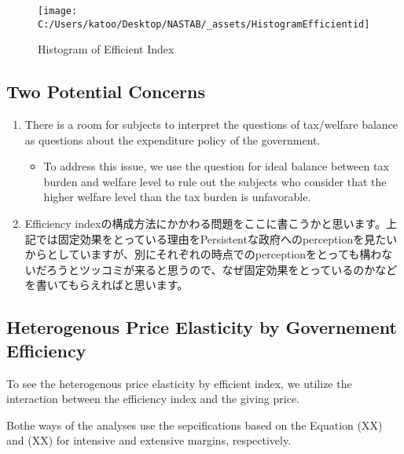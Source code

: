 \documentclass[ review  , 3p ]{elsarticle}
\providecommand{\tightlist}{%
  \setlength{\itemsep}{0pt}\setlength{\parskip}{0pt}}
\begin{document}
  \begin{figure}

  {\centering \texttt{[image: C:/Users/katoo/Desktop/NASTAB/\_assets/HistogramEfficientid]} 

  }

  \caption{Histogram of Efficient Index}\label{fig:unnamed-chunk-1}
  \end{figure}

  \hypertarget{two-potential-concerns}{%
  \subsection{Two Potential Concerns}\label{two-potential-concerns}}

  \begin{enumerate}
  \def\labelenumi{\arabic{enumi}.}
  \tightlist
  \item
    There is a room for subjects to interpret the questions of tax/welfare balance as questions about the expenditure policy of the government.

    \begin{itemize}
    \tightlist
    \item
      To address this issue, we use the question for ideal balance between tax burden and welfare level to rule out the subjects who consider that the higher welfare level than the tax burden is unfavorable.
    \end{itemize}
  \item
    Efficiency indexの構成方法にかかわる問題をここに書こうかと思います。上記では固定効果をとっている理由をPersistentな政府へのperceptionを見たいからとしていますが、別にそれぞれの時点でのperceptionをとっても構わないだろうとツッコミが来ると思うので、なぜ固定効果をとっているのかなどを書いてもらえればと思います。
  \end{enumerate}

  \hypertarget{heterogenous-price-elasticity-by-governement-efficiency}{%
  \subsection{Heterogenous Price Elasticity by Governement Efficiency}\label{heterogenous-price-elasticity-by-governement-efficiency}}

  To see the heterogenous price elasticity by efficient index,
  we utilize the interaction between the efficiency index and the giving price.

  Bothe ways of the analyses use the sepcifications based on the Equation (XX) and (XX) for intensive and extensive margins,
  respectively.
\end{document}
